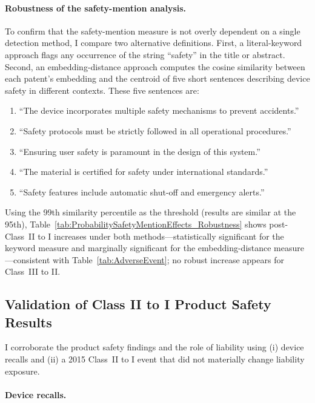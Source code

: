 \documentclass[letterpaper,12pt]{article}
\theoremstyle{definition}
\begin{document}
\paragraph{Robustness of the safety-mention analysis.}

To confirm that the safety-mention measure is not overly dependent on a single detection method, I compare two alternative definitions. First, a literal-keyword approach flags any occurrence of the string “safety” in the title or abstract. Second, an embedding-distance approach computes the cosine similarity between each patent’s embedding and the centroid of five short sentences describing device safety in different contexts. These five sentences are:


\begin{enumerate}
\item ``The device incorporates multiple safety mechanisms to prevent accidents.''
\item ``Safety protocols must be strictly followed in all operational procedures.''
\item ``Ensuring user safety is paramount in the design of this system.''
\item ``The material is certified for safety under international standards.''
\item ``Safety features include automatic shut-off and emergency alerts.''
\end{enumerate}


Using the 99th similarity percentile as the threshold (results are similar at the 95th), Table~\ref{tab:ProbabilitySafetyMentionEffects_Robustness} shows post-Class~II to I increases under both methods---statistically significant for the keyword measure and marginally significant for the embedding-distance measure---consistent with Table~\ref{tab:AdverseEvent}; no robust increase appears for Class~III to II.

\subsection{Validation of Class II to I Product Safety Results}\label{sec:AppenixSafetyValid}


I corroborate the product safety findings and the role of liability using (i) device recalls and (ii) a 2015 Class~II to I event that did not materially change liability exposure.


\paragraph{Device recalls.}\label{sec:Recalls}
\end{document}
